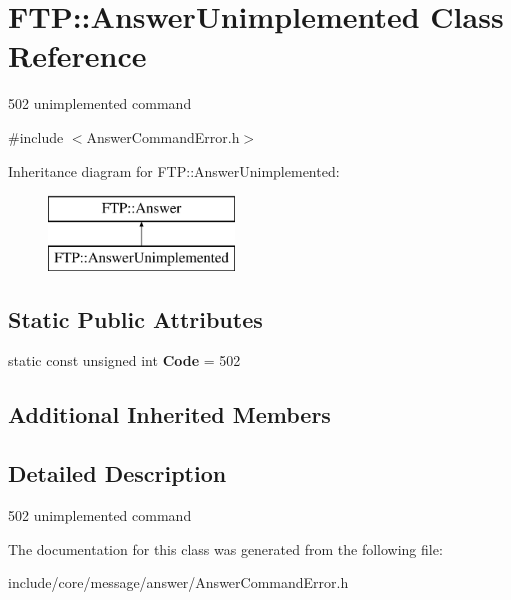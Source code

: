 \hypertarget{class_f_t_p_1_1_answer_unimplemented}{\section{F\-T\-P\-:\-:Answer\-Unimplemented Class Reference}
\label{class_f_t_p_1_1_answer_unimplemented}
}


502 unimplemented command  




{\ttfamily \#include $<$Answer\-Command\-Error.\-h$>$}

Inheritance diagram for F\-T\-P\-:\-:Answer\-Unimplemented\-:\begin{figure}[H]
\begin{center}
\leavevmode
\includegraphics[height=2.000000cm]{class_f_t_p_1_1_answer_unimplemented}
\end{center}
\end{figure}
\subsection*{Static Public Attributes}
\begin{DoxyCompactItemize}
\item 
\hypertarget{class_f_t_p_1_1_answer_unimplemented_a2cd23d0c7ad3f6c5b353012a27cc1fcd}{static const unsigned int {\bfseries Code} = 502}\label{class_f_t_p_1_1_answer_unimplemented_a2cd23d0c7ad3f6c5b353012a27cc1fcd}

\end{DoxyCompactItemize}
\subsection*{Additional Inherited Members}


\subsection{Detailed Description}
502 unimplemented command 

The documentation for this class was generated from the following file\-:\begin{DoxyCompactItemize}
\item 
include/core/message/answer/Answer\-Command\-Error.\-h\end{DoxyCompactItemize}
